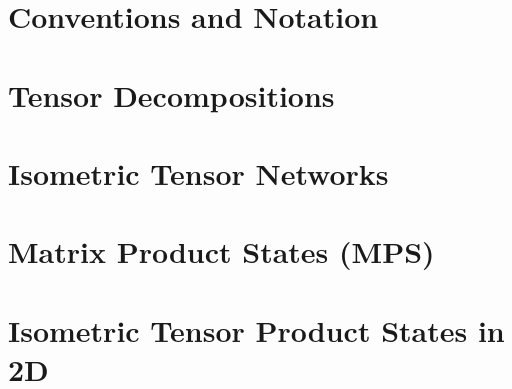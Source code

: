 \section{Conventions and Notation}


\section{Tensor Decompositions}


\section{Isometric Tensor Networks}


\section{Matrix Product States (MPS)}

\section{Isometric Tensor Product States in 2D}